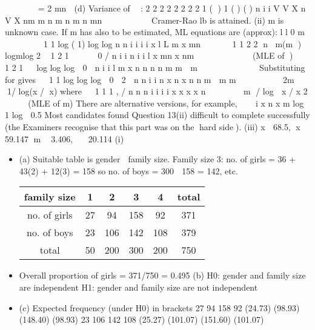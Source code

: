 \documentclass[a4paper,12pt]{article}
\begin{document}
\begin{enumerate}
    

=
2
mn

(d) Variance of  :
2 2
2 2 2 2 2 2
1
( ) 1 ( ) ( )
n
i
i
V V X n V X nm
m n m n m n mn 
 
     
Cramer-Rao lb is attained.
(ii) m is unknown case.
If m has also to be estimated, ML equations are (approx):
l l 0
m
 
 
 
  1
1 log ( 1) log log
n
n i i
i i
x
l L m x mn 

     



1 1
2 2 n \Gammam\beta (m ) logm\beta log 2
1
2 1
     0 /
n
i i n
i i
l x mn x nm 


   \beta 
  

 (MLE of )
 
1
2
1
  log log log  0

n
i i
l m x n n n n m
m  m
\beta   
  \Gamma   		   \beta 
 

Substituting for \hat{\beta}
gives
 
1
1 log log log  0
 2 
n n
i i
n x n x n n m
 m m
 
 \Gamma  \beta  
 	

2m 1/ log(x / x) where  
1
1 1 , / n n n
i i i i x x x x n
 
   
 m / log  x / x 2   \Gamma
 (MLE of m)
There are alternative versions, for example,
 

i x
n
x
m
log 1 log
 0.5
Most candidates found Question 13(ii) difficult to complete successfully (the Examiners
recognise that this part was on the hard side).
(iii) x  68.5, x  59.147 m  3.406,   20.114
 (i) 
\begin{itemize}
    \item (a) Suitable table is gender  family size.
Family size 3: no. of girls = 36 + 43(2) + 12(3) = 158
so no. of boys = 300  158 = 142, etc.

\begin{center}
    \begin{tabular}{|c|c|c|c|c|c}
family size & 1 & 2 & 3 & 4 & total \\ \hline
no. of girls & 27 &  94 & 158 & 92 & 371 \\ \hline
no. of boys & 23 & 106 & 142 & 108 & 379 \\ \hline
total & 50 & 200 & 300 & 200 & 750 \\ \hline
\end{tabular}
\end{center}
\item Overall proportion of girls = 371/750 = 0.495
(b) H0: gender and family size are independent
H1: gender and family size are not independent
\item (c) Expected frequency (under H0) in brackets
27 94 158 92
(24.73) (98.93) (148.40) (98.93)
23 106 142 108
(25.27) (101.07) (151.60) (101.07)


\end{itemize}
\end{enumerate}
\end{document}
